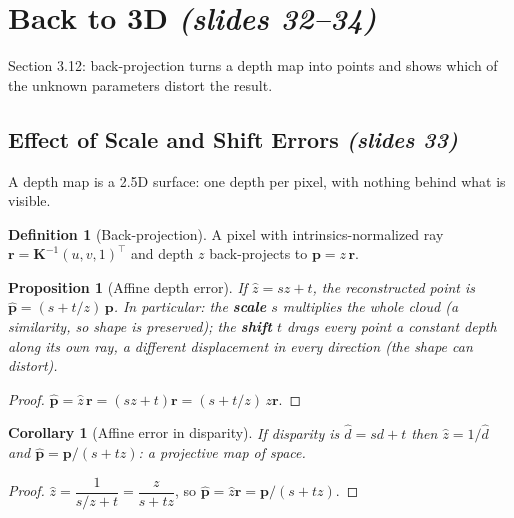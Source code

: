 \documentclass[11pt,a4paper]{article}
\numberwithin{equation}{section}
\newcommand{\slides}[1]{\texorpdfstring{\;\emph{(slides #1)}}{ (slides #1)}}
\theoremstyle{plain}
\newtheorem{proposition}[theorem]{Proposition}
\newtheorem{corollary}[theorem]{Corollary}
\theoremstyle{definition}
\newtheorem{definition}[theorem]{Definition}
\begin{document}
\section{Back to 3D \slides{32--34}}
Section 3.12: back-projection turns a depth map into points and shows which of the unknown parameters distort the result.

\subsection{Effect of Scale and Shift Errors \slides{33}}
A depth map is a 2.5D surface: one depth per pixel, with nothing behind what is visible.

\begin{definition}[Back-projection]
\sloppy
{}
A pixel with intrinsics-normalized ray $\bm r=\bm K^{-1}(u,v,1)^\top$ and depth $z$ back-projects to $\bm p=z\,\bm r$.
\end{definition}

\begin{proposition}[Affine depth error]\label{prop:affine}
If $\hat z=sz+t$, the reconstructed point is $\hat{\bm p}=(s+t/z)\,\bm p$. In particular: the \textbf{scale} $s$ multiplies the whole cloud (a similarity, so shape is preserved); the \textbf{shift} $t$ drags every point a constant depth along its own ray, a different displacement in every direction (the shape can distort).
\end{proposition}
\begin{proof}
$\hat{\bm p}=\hat z\,\bm r=(sz+t)\bm r=(s+t/z)\,z\bm r$.
\end{proof}

\begin{corollary}[Affine error in disparity]
If disparity is $\hat d=sd+t$ then $\hat z=1/\hat d$ and $\hat{\bm p}=\bm p/(s+tz)$: a \emph{projective} map of space.
\end{corollary}
\begin{proof}
$\hat z=\dfrac{1}{s/z+t}=\dfrac{z}{s+tz}$, so $\hat{\bm p}=\hat z\bm r=\bm p/(s+tz)$.
\end{proof}
\end{document}
